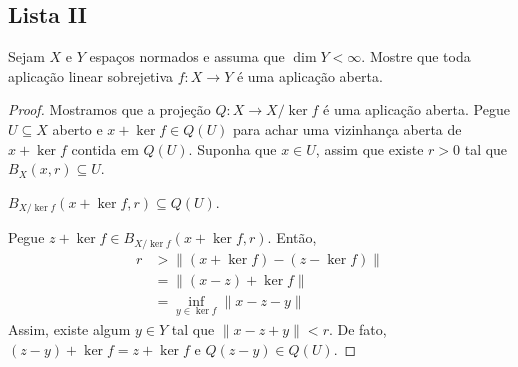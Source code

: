 \documentclass[portuguese]{article}
\theoremstyle{definition}
\begin{document}
	
	\subsection{Lista II}
	\begin{exer*}[2]
		Sejam $X$ e $Y$ espaços normados e assuma que $\dim Y<\infty$. Mostre que toda aplicação linear sobrejetiva $f:X\to Y$ é uma aplicação aberta.
	\end{exer*}
	\begin{proof}
		Mostramos que a projeção $Q:X\to X/\ker f$ é uma aplicação aberta. Pegue $U\subseteq X$ aberto e $x+\ker f\in Q(U)$ para achar uma vizinhança aberta de $x+\ker f$ contida em $Q(U)$. Suponha que $x\in U$, assim que existe $r>0$ tal que $B_X(x,r)\subseteq U$.
		\begin{af*}
			$B_{X/\ker f}(x+\ker f,r)\subseteq Q(U)$.
		\end{af*}
		Pegue $z+\ker f\in B_{X/\ker f}(x+\ker f,r)$. Então,
		\begin{align*}
			r&>\| (x+\ker f)-(z-\ker f)\|\\
			&=\| (x-z)+\ker f\|\\
			&=\inf_{y\in\ker f}\| x-z-y\|
		\end{align*}
		Assim, existe algum $y\in Y$ tal que $\| x-z+y\|<r$. De fato, $(z-y)+\ker f=z+\ker f$ e $Q(z-y)\in Q(U)$.
	\end{proof}
	
\end{document}
